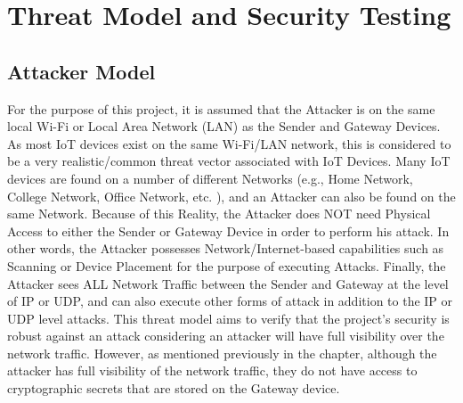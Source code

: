 \documentclass[a4paper]{scrartcl}
\begin{document}
     

    \section{Threat Model and Security Testing}
    \subsection{Attacker Model}
    For the purpose of this project, it is assumed that the Attacker is on the same local Wi-Fi or Local Area Network (LAN) as the Sender and Gateway Devices. As most IoT devices exist on the same Wi-Fi/LAN network, this is considered to be a very realistic/common threat vector associated with IoT Devices. Many IoT devices are found on a number of different Networks (e.g., Home Network, College Network, Office Network, etc. ), and an Attacker can also be found on the same Network. Because of this Reality, the Attacker does NOT need Physical Access to either the Sender or Gateway Device in order to perform his attack. In other words, the Attacker possesses Network/Internet-based capabilities such as Scanning or Device Placement for the purpose of executing Attacks. Finally, the Attacker sees ALL Network Traffic between the Sender and Gateway at the level of IP or UDP, and can also execute other forms of attack in addition to the IP or UDP level attacks. This threat model aims to verify that the project’s security is robust against an attack considering an attacker will have full visibility over the network traffic. However, as mentioned previously in the chapter, although the attacker has full visibility of the network traffic, they do not have access to cryptographic secrets that are stored on the Gateway device.
\end{document}
